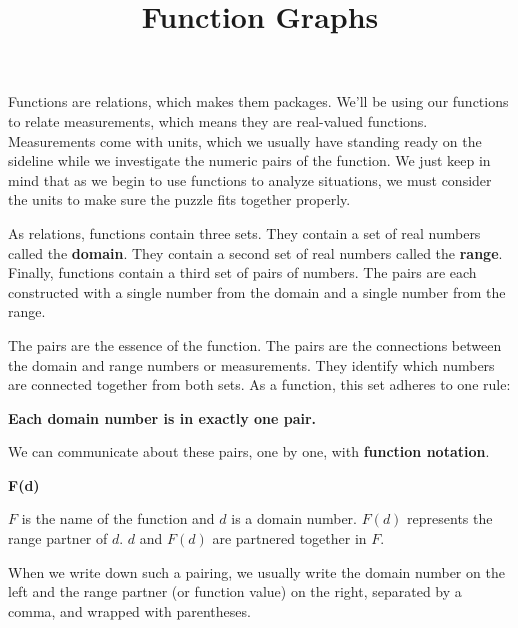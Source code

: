 \documentclass{ximera}
\title{Function Graphs}
\begin{document}
\begin{abstract}

\end{abstract}
\maketitle


Functions are relations, which makes them packages.  We'll be using our functions to relate measurements, which means they are real-valued functions. Measurements come with units, which we usually have standing ready on the sideline while we investigate the numeric pairs of the function. We just keep in mind that as we begin to use functions to analyze situations, we must consider the units to make sure the puzzle fits together properly.



As relations, functions contain three sets.  They contain a set of real numbers called the \textbf{domain}.  They contain a second set of real numbers called the \textbf{range}. Finally, functions contain a third set of pairs of numbers.  The pairs are each constructed with a single number from the domain and a single number from the range.

The pairs are the essence of the function.  The pairs are the connections between the domain and range numbers or measurements.  They identify which numbers are connected together from both sets. As a function, this set adheres to one rule:


\begin{center}
  \textbf{\textcolor{red!90!darkgray}{Each domain number is in exactly one pair.}}
\end{center}



We can communicate about these pairs, one by one, with \textbf{function notation}.



\begin{center}
\textbf{\textcolor{purple!85!blue}{F(d)}}
\end{center}



$F$ is the name of the function and $d$ is a domain number.  $F(d)$ represents the range partner of $d$.  $d$ and $F(d)$ are partnered together in $F$.

When we write down such a pairing, we usually write the domain number on the left and the range partner (or function value) on the right, separated by a comma, and wrapped with parentheses.
\end{document}
